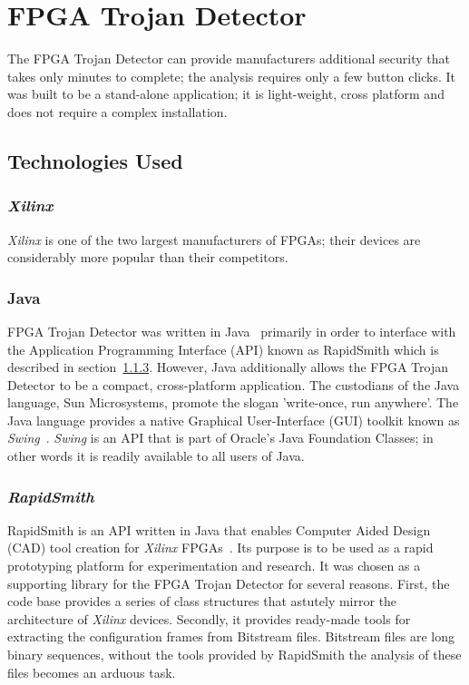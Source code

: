 \documentclass[journal, hidelinks]{IEEEtran}
\begin{document}
\section{FPGA Trojan Detector} \label{sec:implementation}
The FPGA Trojan Detector can provide manufacturers additional security that takes only minutes to complete; the analysis requires only a few button clicks.
It was built to be a stand-alone application; it is light-weight, cross platform and does not require a complex installation.
\subsection{Technologies Used}
\subsubsection{\textit{Xilinx}}
\textit{Xilinx} is one of the two largest manufacturers of FPGAs; their devices are considerably more popular than their competitors.

\subsubsection{Java} \label{sec:java}
FPGA Trojan Detector was written in Java~\cite{java} primarily in order to interface with the Application Programming Interface (API) known as RapidSmith which is described in section~\ref{sec:rapidSmith}.
However, Java additionally allows the FPGA Trojan Detector to be a compact, cross-platform application.
The custodians of the Java language, Sun Microsystems, promote the slogan 'write-once, run anywhere'. 
The Java language provides a native Graphical User-Interface (GUI) toolkit known as \textit{Swing}~\cite{swing}.
\textit{Swing} is an API that is part of Oracle's Java Foundation Classes; in other words it is readily available to all users of Java.

\subsubsection{\textit{RapidSmith}} \label{sec:rapidSmith}
RapidSmith is an API written in Java that enables Computer Aided Design (CAD) tool creation for \textit{Xilinx} FPGAs~\cite{rapidSmith}.
Its purpose is to be used as a rapid prototyping platform for experimentation and research.
It was chosen as a supporting library for the FPGA Trojan Detector for several reasons.
First, the code base provides a series of class structures that astutely mirror the architecture of \textit{Xilinx} devices.
Secondly, it provides ready-made tools for extracting the configuration frames from Bitstream files. 
Bitstream files are long binary sequences, without the tools provided by RapidSmith the analysis of these files becomes an arduous task.
\end{document}
